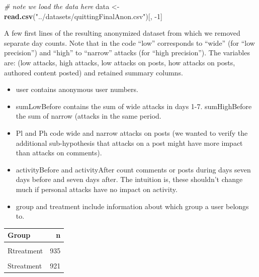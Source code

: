\documentclass[10pt,]{scrartcl}
\newenvironment{Shaded}{\begin{snugshade}}{\end{snugshade}}
\newcommand{\KeywordTok}[1]{\textcolor[rgb]{0.13,0.29,0.53}{\textbf{#1}}}
\newcommand{\DecValTok}[1]{\textcolor[rgb]{0.00,0.00,0.81}{#1}}
\newcommand{\StringTok}[1]{\textcolor[rgb]{0.31,0.60,0.02}{#1}}
\newcommand{\CommentTok}[1]{\textcolor[rgb]{0.56,0.35,0.01}{\textit{#1}}}
\newcommand{\NormalTok}[1]{#1}
\begin{document}
\footnotesize

\begin{Shaded}
\begin{Highlighting}[]
\CommentTok{# note we load the data here}
\NormalTok{data <-}\StringTok{ }\KeywordTok{read.csv}\NormalTok{(}\StringTok{"../datasets/quittingFinalAnon.csv"}\NormalTok{)[, }\DecValTok{-1}\NormalTok{]}
\end{Highlighting}
\end{Shaded}

\normalsize

A few first lines of the resulting anonymized dataset from which we
removed separate day counts. Note that in the code ``low'' corresponds
to ``wide'' (for ``low precision'') and ``high'' to ``narrow'' attacks
(for ``high precision''). The variables are: (low attacks, high attacks,
low attacks on posts, how attacks on posts, authored content posted) and
retained summary columns.

\begin{itemize}

\item \textsf{user} contains anonymous user numbers.
\item \textsf{sumLowBefore} contains the sum of \textsf{wide}  attacks in days 1-7. \textsf{sumHighBefore} the sum of \textsf{narrow} (attacks in the same period. 
\item \textsf{Pl} and \textsf{Ph} code \textsf{wide} and \textsf{narrow} attacks on posts (we wanted to verify the additional sub-hypothesis that  attacks on a post might have more impact than attacks on comments).

\item \textsf{activityBefore} and \textsf{activityAfter} count comments or posts during days seven days before and seven days after. The intuition is, these shouldn't change much if personal attacks have  no impact on activity.

\item \textsf{group} and \textsf{treatment} include information about which group a user belongs to.

\end{itemize}

\footnotesize 

\begin{table}
\centering\begingroup\fontsize{9}{11}\selectfont

\begin{tabular}{lr}
\toprule
Group & n\\
\midrule
\cellcolor{gray!6}{Rcontrol} & \cellcolor{gray!6}{875}\\
Rtreatment & 935\\
\cellcolor{gray!6}{Scontrol} & \cellcolor{gray!6}{942}\\
Streatment & 921\\
\bottomrule
\end{tabular}
\endgroup{}
\end{table}
\end{document}
